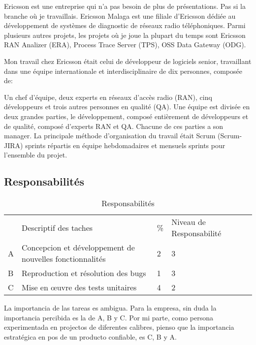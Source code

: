 \documentclass{resume} %
\begin{document}
Ericsson est une entreprise qui n'a pas besoin de plus de présentations. Pas si la branche où je travaillais.
Ericsson Malaga est une filiale d'Ericsson dédiée au développement de systèmes de diagnostic de réseaux radio téléphoniques.
Parmi plusieurs autres projets, les projets où je joue la plupart du temps sont Ericsson RAN \footnotemark Analizer  (ERA), Process Trace Server (TPS), OSS Data Gateway (ODG). 


Mon travail chez Ericsson était celui de développeur de logiciels senior, travaillant dans une équipe internationale et interdisciplinaire de dix personnes, composée de:

Un chef d'équipe, deux experts en réseaux d'accès radio (RAN), cinq développeurs et trois autres personnes en qualité (QA).
Une équipe est divisée en deux grandes parties, le développement, composé entièrement de développeurs et de qualité, composé d'experts RAN et QA. Chacune de ces parties a son manager.
La principale méthode d'organisation du travail était Scrum (Scrum-JIRA) sprints répartis en équipe hebdomadaires et mensuels sprints pour l'ensemble du projet.


\subsection{Responsabilités}
	
	
\begin{table}[!htbp]
\label{my-label}
\begin{tabular}{|l|l|l|l|l}
\cline{1-4}
   & Descriptif des taches &  \% & Niveau de Responsabilité \footnotemark  &  \\ \cline{1-4}  
A & Concepcion et développement de nouvelles fonctionnalités & 2 & 3 & \\ \cline {1-4}
B & Reproduction et résolution des bugs & 1 & 3 & \\ \cline {1-4}
C & Mise en œuvre des tests unitaires & 4 & 2 & \\ \cline {1-4}
\end{tabular}
\caption{Responsabilités}
\end{table}

La importancia de las tareas es ambigua. Para la empresa, sin duda la importancia percibida es la de A, B y C. Por mi parte, como persona experimentada en projectos de diferentes calibres, pienso que la importancia estratégica en pos de un producto confiable, es C, B y A.
 
\end{document}

